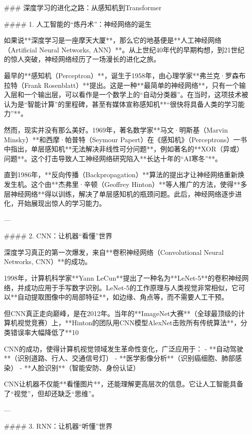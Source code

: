 ### 深度学习的进化之路：从感知机到Transformer

#### 1. 人工智能的“炼丹术”：神经网络的诞生

如果说**深度学习是一座摩天大厦**，那么它的地基便是**人工神经网络（Artificial Neural Networks, ANN）**。从上世纪40年代的早期构想，到21世纪的惊人突破，神经网络经历了一场漫长的进化之旅。

最早的**感知机（Perceptron）**，诞生于1958年，由心理学家**弗兰克·罗森布拉特（Frank Rosenblatt）**提出。这是一种**最简单的神经网络**，只有一个输入层和一个输出层，可以看作是一个数学上的“自动分类器”。在当时，这项技术被认为是“智能计算”的里程碑，甚至有媒体宣称感知机**“很快将具备人类的学习能力”**。

然而，现实并没有那么美好。1969年，著名数学家**马文·明斯基（Marvin Minsky）**和西摩·帕普特（Seymour Papert）在《感知机》（Perceptrons）一书中指出，单层感知机**无法解决非线性可分问题**，例如著名的**XOR（异或）问题**。这个打击导致人工神经网络研究陷入**长达十年的“AI寒冬”**。

直到1986年，**反向传播（Backpropagation）**算法的提出才让神经网络重新焕发生机。这个由**杰弗里·辛顿（Geoffrey Hinton）**等人推广的方法，使得**多层神经网络**得以训练，解决了单层感知机的瓶颈问题。此后，神经网络逐步进化，开始展现出惊人的学习能力。

---

#### 2. CNN：让机器“看懂”世界

深度学习真正的第一次爆发，来自**卷积神经网络（Convolutional Neural Networks, CNN）**的成功。

1998年，计算机科学家**Yann LeCun**提出了一种名为**LeNet-5**的卷积神经网络，并成功应用于手写数字识别。LeNet-5的工作原理与人类视觉非常相似，它可以**自动提取图像中的局部特征**，如边缘、角点等，而不需要人工干预。

但CNN真正走向巅峰，是在2012年。当年的**ImageNet大赛**（全球最顶级的计算机视觉竞赛）上，**Hinton的团队用CNN模型AlexNet击败所有传统算法**，分类错误率大幅降低了**10%

CNN的成功，使得计算机视觉领域发生革命性变化，广泛应用于：
- **自动驾驶**（识别道路、行人、交通信号灯）
- **医学影像分析**（识别癌细胞、肺部感染）
- **人脸识别**（智能安防、身份认证）

CNN让机器不仅能**看懂图片**，还能理解更高层次的信息。它让人工智能具备了“视觉”，但却还缺乏“思维”。

---

#### 3. RNN：让机器“听懂”世界


